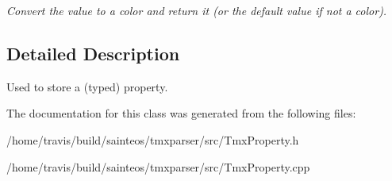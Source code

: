 \begin{DoxyCompactItemize}
\begin{DoxyCompactList}\small\item\em Convert the value to a color and return it (or the default value if not a color). \end{DoxyCompactList}\end{DoxyCompactItemize}


\subsection{Detailed Description}
Used to store a (typed) property. 

The documentation for this class was generated from the following files\-:\begin{DoxyCompactItemize}
\item 
/home/travis/build/sainteos/tmxparser/src/Tmx\-Property.\-h\item 
/home/travis/build/sainteos/tmxparser/src/Tmx\-Property.\-cpp\end{DoxyCompactItemize}
